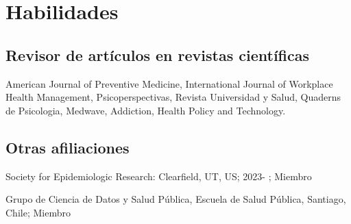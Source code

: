 \documentclass[11pt,a4paper,]{awesome-cv}
\begin{document}
\section{Habilidades}\label{habilidades}

\begin{cventries}
    \vspace{-4.0mm}
    \vspace{-4.0mm}
    \vspace{-4.0mm}
    \vspace{-4.0mm}
\end{cventries}

\hfill \break

\fontsize{10pt}{1.5em}\color{text}

\subsection{Revisor de artículos en revistas
científicas}\label{revisor-de-artuxedculos-en-revistas-cientuxedficas}

\begin{footnotesize}
American Journal of Preventive Medicine, International Journal of Workplace Health Management, Psicoperspectivas, Revista Universidad y Salud, Quaderns de Psicologia, Medwave, Addiction, Health Policy and Technology.
\end{footnotesize}
\fontsize{10pt}{1.5em}\color{text}

\hfill \break

\subsection{Otras afiliaciones}\label{otras-afiliaciones}

\begin{footnotesize}
Society for Epidemiologic Research: Clearfield, UT, US; 2023- ; Miembro

Grupo de Ciencia de Datos y Salud Pública, Escuela de Salud Pública, Santiago, Chile; Miembro
\end{footnotesize}
\pagebreak

\linebreak
\end{document}
